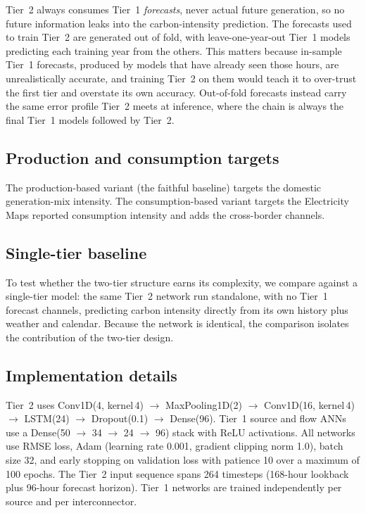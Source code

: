 \documentclass[sigconf,nonacm,a4paper]{acmart}  %
\begin{document}
Tier~2 always consumes Tier~1 \emph{forecasts}, never actual future generation, so
no future information leaks into the carbon-intensity prediction. The forecasts used
to train Tier~2 are generated out of fold, with leave-one-year-out Tier~1 models
predicting each training year from the others. This matters because in-sample
Tier~1 forecasts, produced by models that have already seen those hours, are
unrealistically accurate, and training Tier~2 on them would teach it to over-trust
the first tier and overstate its own accuracy. Out-of-fold forecasts instead carry
the same error profile Tier~2 meets at inference, where the chain is always the
final Tier~1 models followed by Tier~2.

\subsection{Production and consumption targets}
The production-based variant (the faithful baseline) targets the domestic
generation-mix intensity. The consumption-based variant targets the
Electricity Maps reported consumption intensity and adds the cross-border channels.

\subsection{Single-tier baseline}
To test whether the two-tier structure earns its complexity, we compare against a
single-tier model: the same Tier~2 network run standalone, with no Tier~1 forecast
channels, predicting carbon intensity directly from its own history plus weather
and calendar. Because the network is identical, the comparison isolates the
contribution of the two-tier design.

\subsection{Implementation details}
Tier~2 uses Conv1D(4, kernel\,4) $\to$ MaxPooling1D(2) $\to$ Conv1D(16, kernel\,4) $\to$ LSTM(24) $\to$ Dropout(0.1) $\to$ Dense(96). Tier~1 source and flow ANNs use a Dense(50 $\to$ 34 $\to$ 24 $\to$ 96) stack with ReLU activations. All networks use RMSE loss, Adam (learning rate 0.001, gradient clipping norm 1.0), batch size 32, and early stopping on validation loss with patience 10 over a maximum of 100 epochs. The Tier~2 input sequence spans 264 timesteps (168-hour lookback plus 96-hour forecast horizon). Tier~1 networks are trained independently per source and per interconnector.
\end{document}
